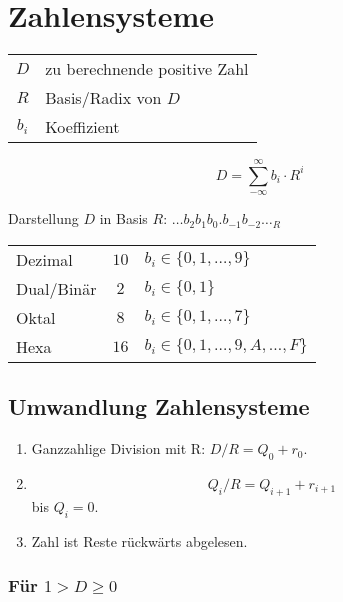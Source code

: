 \section{Zahlensysteme}
\begin{center}
    \begin{minipage}{0.65\linewidth}
        \begin{center}
            \begin{tabular}{c l}
                $D$ & zu berechnende positive Zahl\\
                $R$ & Basis/Radix von $D$\\
                $b_i$ & Koeffizient
            \end{tabular}
        \end{center}
    \end{minipage}
    \hfill
    \begin{minipage}{0.3\linewidth}
        \begin{equation*}
            D = \sum_{-\infty}^{\infty} b_i \cdot R^i
        \end{equation*}
    \end{minipage}
\end{center}
Darstellung $D$ in Basis $R$: $\dots b_2 b_1 b_0 . b_{-1} b_{-2} \dots _{R}$
\begin{flushleft}
    \begin{tabular}{l c l}
        Dezimal & $10$ & $b_i \in \{0, 1, \dots, 9\}$\\
        Dual/Binär & $2$ & $b_i \in \{0, 1\}$\\
        Oktal & $8$ & $b_i \in \{0, 1, \dots, 7\}$\\
        Hexa & $16$ & $b_i \in \{0, 1, \dots, 9, A, \dots, F\}$\\
    \end{tabular}
\end{flushleft}

\subsection{Umwandlung Zahlensysteme}
\begin{enumerate}
    \item Ganzzahlige Division mit R: $D/R = Q_0 + r_0$.
    \item $$Q_i/R = Q_{i + 1} + r_{i + 1}$$ bis $Q_i = 0$.
    \item Zahl ist Reste rückwärts abgelesen.
\end{enumerate}
\subsubsection{Für $1 > D \geq 0$}

